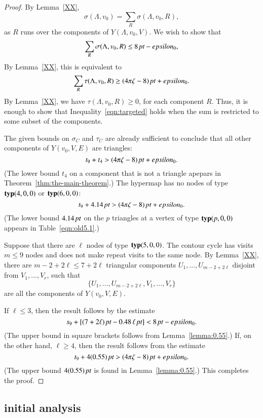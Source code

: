 \begin{proof}  
By Lemma~\ref{XX},
  $$
  \sigma(\Lambda,v_0) = \sum_{R}\sigma(\Lambda,v_0,R),
  $$
as $R$ runs over the components of $Y(\Lambda,v_0,V)$.
We wish to show that
  $$
  \sum_{R}\sigma(\Lambda,v_0,R)\le 8\,\hbox{\it pt} -epsilon_0,
  $$
By Lemma~\ref{XX}, this is equivalent to
  \begin{equation}
  \sum_{R} \tau(\Lambda,v_0,R)\ge (4\pi\zeta-8)\,\hbox{\it pt}+epsilon_0.
  \label{eqn:targeted}
  \end{equation}
By Lemma~\ref{XX}, we have $\tau(\Lambda,v_0,R)\ge0$, for
each component $R$.  Thus, it is enough to show that
Inequality~\ref{eqn:targeted} holds when the sum is restricted
to some subset of the components.

The given bounds on $\sigma_C$ and $\tau_C$ are
already sufficient to conclude that all other components of
$Y(v_0,V,E)$ are triangles:
   $$
   t_9 + t_4 > (4\pi\zeta -8)\,\hbox{\it pt} + epsilon_0.
   $$
(The lower bound $t_4$ on a component that is not a triangle apepars
in Theorem~\ref{thm:the-main-theorem}.)
The hypermap has no nodes of type ${\operatorname{\bf typ}}{(4,0,0)}$ or ${\operatorname{\bf typ}}{(6,0,0)}$:
$$
   t_9 + 4.14\,\hbox{\it pt} > (4\pi\zeta-8)\,\hbox{\it pt} + epsilon_0.
$$
(The lower bound $4.14\,\hbox{\it pt}$ on the $p$ triangles at a vertex
of type ${\operatorname{\bf typ}}{(p,0,0)}$ appears in Table~\ref{eqn:old5.1}.)

Suppose that there are $\ell$ nodes of type ${\operatorname{\bf typ}}{(5,0,0)}$.  The
contour cycle has visits  $m\le 9$ nodes and does
not make repeat visits to the same node.  By Lemma~\ref{XX},
there are $m-2 + 2\ell\le 7+2\ell$ 
triangular components $U_1,\ldots,U_{m-2+2\ell}$
disjoint from $V_1,\ldots,V_r$, such that
   $$
   \{U_1,\ldots,U_{m-2+2\ell},V_1,\ldots,V_r\}
   $$
are all the components of $Y(v_0,V,E)$.

If $\ell\le 3$, then the result follows by the estimate
   $$
   s_9 + [(7+2\ell)\,\hbox{\it pt} - 0.48\,\ell\,\hbox{\it pt}] < 8\,\hbox{\it pt} - epsilon_0.
   $$
(The upper bound in square brackets follows from Lemma~\ref{lemma:0.55}.)
If, on the other hand, $\ell\ge 4$, then the result follows from
the estimate
   $$
   t_9 + 4 (0.55)\,\hbox{\it pt} > (4\pi\zeta -8)\,\hbox{\it pt} + epsilon_0.
   $$
(The upper bound $4(0.55)\,\hbox{\it pt}$ is found in Lemma~\ref{lemma:0.55}.)
This completes the proof.
\end{proof}

\subsection{initial analysis}

